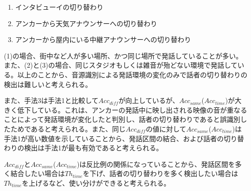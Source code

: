 \begin{enumerate}
\item インタビューイの切り替わり
\item アンカーから天気アナウンサーへの切り替わり
\item アンカーから屋内にいる中継アナウンサーへの切り替わり
\end{enumerate}

(1)の場合、街中など人が多い場所、かつ同じ場所で発話していることが多い。また、(2)と(3)の場合、同じスタジオもしくは雑音が殆どない環境で発話している。以上のことから、音源識別による発話環境の変化のみで話者の切り替わりの検出は難しいと考えられる。\par
また、手法3は手法1と比較して$Acc_{diff}$が向上しているが、$Acc_{same}$($Acc_{time}$)が大きく低下している。これは、アンカーの発話中に映し出される映像の音が重なることによって発話環境が変化したと判別し、話者の切り替わりであると誤識別したためであると考えられる。また、同じ$Acc_{diff}$の値に対して$Acc_{same}$($Acc_{time}$)は手法1が高い数値を示していることから、発話区間の結合、および話者の切り替わりの検出は手法1が最も有効であると考えられる。\par
$Acc_{diff}$と$Acc_{same}$($Acc_{time}$)は反比例の関係になっていることから、発話区間を多く結合したい場合は$Th_{time}$を下げ、話者の切り替わりを多く検出したい場合は$Th_{time}$を上げるなど、使い分けができると考えられる。
